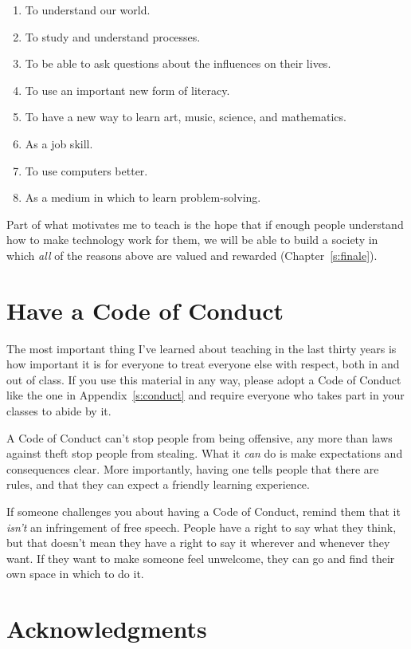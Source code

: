 \begin{enumerate}
\item
  To understand our world.
\item
  To study and understand processes.
\item
  To be able to ask questions about the influences on their lives.
\item
  To use an important new form of literacy.
\item
  To have a new way to learn art, music, science, and mathematics.
\item
  As a job skill.
\item
  To use computers better.
\item
  As a medium in which to learn problem-solving.
\end{enumerate}

Part of what motivates me to teach is the hope that if enough people
understand how to make technology work for them, we will be able to
build a society in which \emph{all} of the reasons above are valued and
rewarded (Chapter~\ref{s:finale}).

\section{Have a Code of Conduct}\label{s:intro-code-of-conduct}

The most important thing I've learned about teaching in the last thirty
years is how important it is for everyone to treat everyone else with
respect, both in and out of class. If you use this material in any way,
please adopt a Code of Conduct like the one in Appendix~\ref{s:conduct}
and require everyone who takes part in your classes to abide by it.

A Code of Conduct can't stop people from being offensive, any more than
laws against theft stop people from stealing. What it \emph{can} do is make
expectations and consequences clear. More importantly, having one tells
people that there are rules, and that they can expect a friendly
learning experience.

If someone challenges you about having a Code of Conduct, remind them
that it \emph{isn't} an infringement of free speech. People have a right to
say what they think, but that doesn't mean they have a right to say it
wherever and whenever they want. If they want to make someone feel
unwelcome, they can go and find their own space in which to do it.

\section{Acknowledgments}\label{s:intro-acknowledgments}

